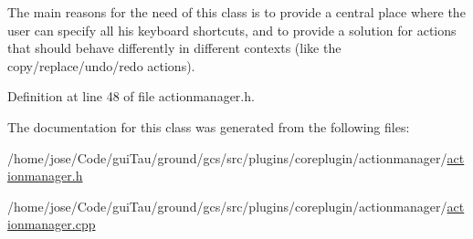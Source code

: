 The main reasons for the need of this class is to provide a central place where the user can specify all his keyboard shortcuts, and to provide a solution for actions that should behave differently in different contexts (like the copy/replace/undo/redo actions).

Definition at line 48 of file actionmanager.\-h.



The documentation for this class was generated from the following files\-:\begin{DoxyCompactItemize}
\item 
/home/jose/\-Code/gui\-Tau/ground/gcs/src/plugins/coreplugin/actionmanager/\hyperlink{actionmanager_8h}{actionmanager.\-h}\item 
/home/jose/\-Code/gui\-Tau/ground/gcs/src/plugins/coreplugin/actionmanager/\hyperlink{actionmanager_8cpp}{actionmanager.\-cpp}\end{DoxyCompactItemize}
